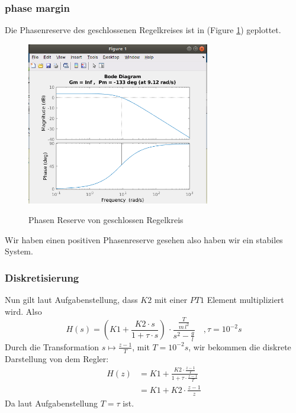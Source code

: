 \documentclass{article}
\begin{document}
\subsubsection{phase margin}
Die Phasenreserve des geschlossenen Regelkreises ist in (Figure \ref{fig:phaseMargin}) geplottet.
\begin{figure}[h]
	\caption{Phasen Reserve von geschlossen Regelkreis}
	\centering
	\includegraphics[width=8cm]{phaseMargin}
	\label{fig:phaseMargin}
\end{figure}
Wir haben einen positiven Phasenreserve gesehen also haben wir
ein stabiles System.
\subsubsection{Diskretisierung}
Nun gilt laut Aufgabenstellung, dass $K2$ mit einer $PT1$ Element multipliziert wird. Also
\[
	H(s) = (K1 + \frac{K2 \cdot s}{1 + \tau \cdot s}) \, \cdot \frac{\frac{T}{m\,l^2}}{s^2 - \frac{g}{l}}\quad, \tau = 10^{-2}s
\]
Durch die Transformation $s \mapsto \frac{z - 1}{T}$, mit $T = 10^{-2} s$, wir bekommen die diskrete Darstellung von dem Regler:
\begin{align*}
	H(z) &= K1 + \frac{K2\cdot\frac{z - 1}{T}}{1 + \tau \cdot \frac{z-1}{T}} \\
		&= K1 + K2 \cdot \frac{z - 1}{z}
\end{align*}
Da laut Aufgabenstellung $T = \tau$ ist.
\end{document}
